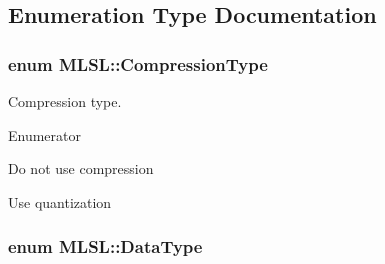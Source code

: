 \subsection{Enumeration Type Documentation}
\hypertarget{namespaceMLSL_a68b033a19889eaa288c1d10b85d23ea2}{
\subsubsection[{Compression\-Type}]{\setlength{\rightskip}{0pt plus 5cm}enum {\bf M\-L\-S\-L\-::\-Compression\-Type}}}\label{namespaceMLSL_a68b033a19889eaa288c1d10b85d23ea2}
Compression type. \begin{Desc}
\item[Enumerator]\par
\begin{description}
\item[{\em 
\hypertarget{namespaceMLSL_a68b033a19889eaa288c1d10b85d23ea2aff711dbf9b304ee795e007e5e667cd52}{C\-T\-\_\-\-N\-O\-N\-E}\label{namespaceMLSL_a68b033a19889eaa288c1d10b85d23ea2aff711dbf9b304ee795e007e5e667cd52}
}]Do not use compression \item[{\em 
\hypertarget{namespaceMLSL_a68b033a19889eaa288c1d10b85d23ea2a387a43f9648f4692e3d939b34082c395}{C\-T\-\_\-\-Q\-U\-A\-N\-T\-I\-Z\-A\-T\-I\-O\-N}\label{namespaceMLSL_a68b033a19889eaa288c1d10b85d23ea2a387a43f9648f4692e3d939b34082c395}
}]Use quantization \end{description}
\end{Desc}
\hypertarget{namespaceMLSL_a09825f36959e78645dd9bc70bdf840ba}{
\subsubsection[{Data\-Type}]{\setlength{\rightskip}{0pt plus 5cm}enum {\bf M\-L\-S\-L\-::\-Data\-Type}}}\label{namespaceMLSL_a09825f36959e78645dd9bc70bdf840ba}
